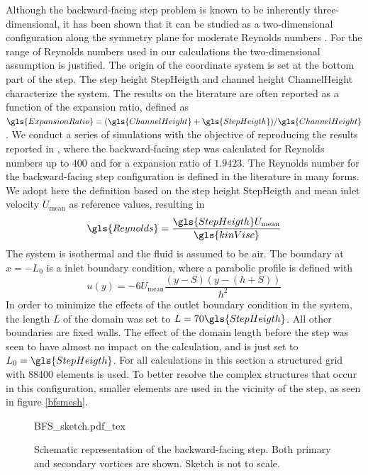 Although the backward-facing step problem is known to be inherently three-dimensional, it has been shown that it can be studied as a two-dimensional configuration along the symmetry plane for moderate Reynolds numbers \citep{barkleyThreedimensionalInstabilityFlow2000, biswasBackwardFacingStepFlows2004}. For the range of Reynolds numbers used in our calculations the two-dimensional assumption is justified.  The origin of the coordinate system is set at the bottom part of the step. The step height \gls{StepHeigth} and channel height \gls{ChannelHeight} characterize the system. The results on the literature are often reported as a function of the expansion ratio, defined as $\gls{ExpansionRatio} = (\gls{ChannelHeight}+\gls{StepHeigth})/\gls{ChannelHeight}$.
We conduct a series of simulations with the objective of reproducing the results reported in \cite{biswasBackwardFacingStepFlows2004}, where the backward-facing step was calculated for Reynolds numbers up to $400$ and for a expansion ratio of $1.9423$.
The Reynolds number for the backward-facing step configuration is defined in the literature in many forms. We adopt here the definition based on the step height \gls{StepHeigth} and mean inlet velocity $U_{\text{mean}}$ as reference values, resulting in
\begin{equation}
	\gls{Reynolds}= \frac{\gls{StepHeigth}U_{\text{mean}}}{\gls{kinVisc}}
\end{equation}
The system is isothermal and the fluid is assumed to be air. The boundary at $ x = -L_0$ is a inlet boundary condition, where a parabolic profile is defined with %
\begin{equation}
	u(y) = -6U_{\text{mean}}\frac{(y-S)(y-(h+S))}{h^2}
\end{equation}
In order to minimize the effects of the outlet  boundary condition in the system, the length $L$ of the domain was set to $L = 70 \gls{StepHeigth}$. All other boundaries are fixed walls. The effect of the domain length before the step was seen to have almost no impact on the calculation, and is just set to $L_0 = \gls{StepHeigth}$. For all calculations in this section a structured grid with 88400 elements is used. To better resolve the complex structures that occur in this configuration, smaller elements are used in the vicinity of the step, as seen in figure \cref{bfsmesh}.

\begin{figure}[tb]
	\begin{center}
		\def\svgwidth{0.9\textwidth}
		{BFS_sketch.pdf_tex}
		\caption{Schematic representation of the backward-facing step. Both primary and secondary vortices are shown. Sketch is not to scale.}
		\label{BFSsketch}
	\end{center}
\end{figure}

